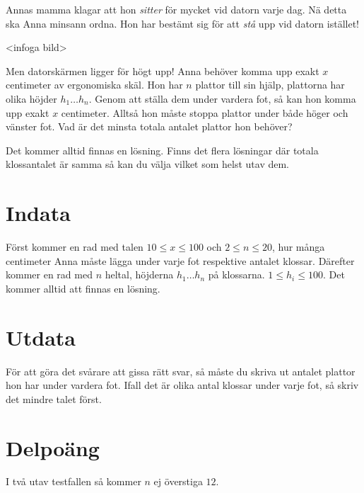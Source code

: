 Annas mamma klagar att hon \emph{sitter} för mycket vid datorn varje
dag. Nä detta ska Anna minsann ordna. Hon har bestämt sig för att
\emph{stå} upp vid datorn istället!

<infoga bild>

Men datorskärmen ligger för högt upp! Anna behöver komma upp exakt
$x$ centimeter av ergonomiska skäl. Hon har $n$ plattor till sin
hjälp, plattorna har olika höjder $h_1 \dots h_n$. Genom att ställa
dem under vardera fot, så kan hon komma upp exakt $x$ centimeter.
Alltså hon måste stoppa plattor under både höger och vänster fot.
Vad är det minsta totala antalet plattor hon behöver?

Det kommer alltid finnas en lösning. Finns det flera lösningar där
totala klossantalet är samma så kan du välja vilket som helst utav
dem.

\section*{Indata}

Först kommer en rad med talen $10 \leq x \leq 100$ och $2 \leq n \leq 20$, hur många centimeter Anna
måste lägga under varje fot respektive antalet klossar. Därefter kommer
en rad med $n$ heltal, höjderna $h_1 \dots h_n$ på klossarna. $1 \leq h_i \leq 100$.
Det kommer alltid att finnas en lösning.

\section*{Utdata}

För att göra det svårare att gissa rätt svar, så måste du skriva
ut antalet plattor hon har under vardera fot. Ifall det är olika antal
klossar under varje fot, så skriv det mindre talet först.

\section*{Delpoäng}

I två utav testfallen så kommer $n$ ej överstiga $12$.
